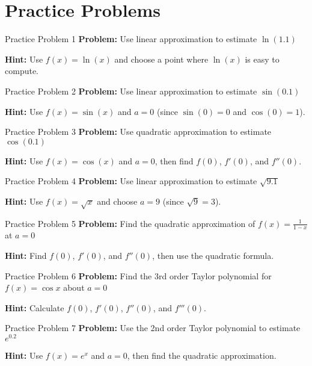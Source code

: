 \documentclass[aspectratio=169]{beamer}
\begin{document}
\section{Practice Problems}

\begin{frame}{Practice Problem 1}
\textbf{Problem:} Use linear approximation to estimate $\ln(1.1)$

\textbf{Hint:} Use $f(x) = \ln(x)$ and choose a point where $\ln(x)$ is easy to compute.
\end{frame}

\begin{frame}{Practice Problem 2}
\textbf{Problem:} Use linear approximation to estimate $\sin(0.1)$

\textbf{Hint:} Use $f(x) = \sin(x)$ and $a = 0$ (since $\sin(0) = 0$ and $\cos(0) = 1$).
\end{frame}

\begin{frame}{Practice Problem 3}
\textbf{Problem:} Use quadratic approximation to estimate $\cos(0.1)$

\textbf{Hint:} Use $f(x) = \cos(x)$ and $a = 0$, then find $f(0)$, $f'(0)$, and $f''(0)$.
\end{frame}

\begin{frame}{Practice Problem 4}
\textbf{Problem:} Use linear approximation to estimate $\sqrt{9.1}$

\textbf{Hint:} Use $f(x) = \sqrt{x}$ and choose $a = 9$ (since $\sqrt{9} = 3$).
\end{frame}

\begin{frame}{Practice Problem 5}
\textbf{Problem:} Find the quadratic approximation of $f(x) = \frac{1}{1-x}$ at $a = 0$

\textbf{Hint:} Find $f(0)$, $f'(0)$, and $f''(0)$, then use the quadratic formula.
\end{frame}

\begin{frame}{Practice Problem 6}
\textbf{Problem:} Find the 3rd order Taylor polynomial for $f(x) = \cos x$ about $a = 0$

\textbf{Hint:} Calculate $f(0)$, $f'(0)$, $f''(0)$, and $f'''(0)$.
\end{frame}

\begin{frame}{Practice Problem 7}
\textbf{Problem:} Use the 2nd order Taylor polynomial to estimate $e^{0.2}$

\textbf{Hint:} Use $f(x) = e^x$ and $a = 0$, then find the quadratic approximation.
\end{frame}
\end{document}
